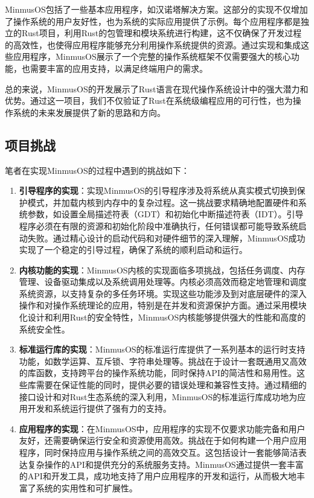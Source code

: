 MinmusOS包括了一些基本应用程序，如汉诺塔解决方案。这部分的实现不仅增加了操作系统的用户友好性，也为系统的实际应用提供了示例。每个应用程序都是独立的Rust项目，利用Rust的包管理和模块系统进行构建，这不仅确保了开发过程的高效性，也使得应用程序能够充分利用操作系统提供的资源。通过实现和集成这些应用程序，MinmusOS展示了一个完整的操作系统框架不仅需要强大的核心功能，也需要丰富的应用支持，以满足终端用户的需求。

总的来说，MinmusOS的开发展示了Rust语言在现代操作系统设计中的强大潜力和优势。通过这一项目，我们不仅验证了Rust在系统级编程应用的可行性，也为操作系统的未来发展提供了新的思路和方向。

\subsection{项目挑战}

笔者在实现MinmusOS的过程中遇到的挑战如下：

\begin{enumerate}
    \item \textbf{引导程序的实现}：实现MinmusOS的引导程序涉及将系统从真实模式切换到保护模式，并加载内核到内存中的复杂过程。这一挑战要求精确地配置硬件和系统参数，如设置全局描述符表（GDT）和初始化中断描述符表（IDT）。引导程序必须在有限的资源和初始化阶段中准确执行，任何错误都可能导致系统启动失败。通过精心设计的启动代码和对硬件细节的深入理解，MinmusOS成功实现了一个稳定的引导过程，确保了系统的顺利启动和运行。
    \item \textbf{内核功能的实现}：MinmusOS内核的实现面临多项挑战，包括任务调度、内存管理、设备驱动集成以及系统调用处理等。内核必须高效而稳定地管理和调度系统资源，以支持复杂的多任务环境。实现这些功能涉及到对底层硬件的深入操作和对操作系统理论的应用，特别是在并发和资源保护方面。通过采用模块化设计和利用Rust的安全特性，MinmusOS内核能够提供强大的性能和高度的系统安全性。
    \item \textbf{标准运行库的实现}：MinmusOS的标准运行库提供了一系列基本的运行时支持功能，如数学运算、互斥锁、字符串处理等。挑战在于设计一套既通用又高效的库函数，支持跨平台的操作系统功能，同时保持API的简洁性和易用性。这些库需要在保证性能的同时，提供必要的错误处理和兼容性支持。通过精细的接口设计和对Rust生态系统的深入利用，MinmusOS的标准运行库成功地为应用开发和系统运行提供了强有力的支持。
    \item \textbf{应用程序的实现}：在MinmusOS中，应用程序的实现不仅要求功能完备和用户友好，还需要确保运行安全和资源使用高效。挑战在于如何构建一个用户应用程序，同时保持应用与操作系统之间的高效交互。这包括设计一套能够简洁表达复杂操作的API和提供充分的系统服务支持。MinmusOS通过提供一套丰富的API和开发工具，成功地支持了用户应用程序的开发和运行，从而极大地丰富了系统的实用性和可扩展性。
\end{enumerate}

